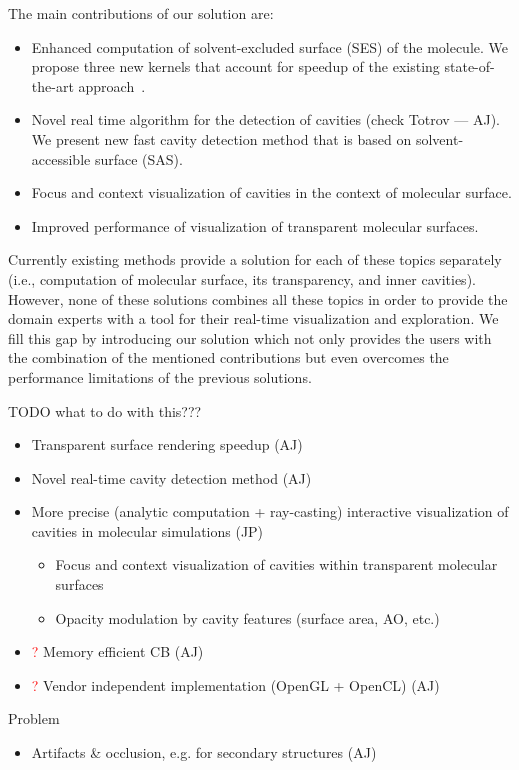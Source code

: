The main contributions of our solution are:
\begin{itemize}
  \item Enhanced computation of solvent-excluded surface (SES) of the molecule. We propose three new kernels that account for speedup of the existing state-of-the-art approach~\cite{todo}.
  \item Novel real time algorithm for the detection of cavities (check Totrov --- AJ). We present new fast cavity detection method that is based on solvent-accessible surface (SAS).
  \item Focus and context visualization of cavities in the context of molecular surface.
  \item Improved performance of visualization of transparent molecular surfaces.~\cite{todo}
\end{itemize}

Currently existing methods provide a solution for each of these topics separately (i.e., computation of molecular surface, its transparency, and inner cavities).
However, none of these solutions combines all these topics in order to provide the domain experts with a tool for their real-time visualization and exploration.
We fill this gap by introducing our solution which not only provides the users with the combination of the mentioned contributions but even overcomes the performance limitations of the previous solutions.


TODO what to do with this???
\begin{itemize}
  \item Transparent surface rendering speedup (AJ)
	\item Novel real-time cavity detection method (AJ)
	\item More precise (analytic computation + ray-casting) interactive visualization of cavities in molecular simulations (JP)
	\begin{itemize}
		\item Focus and context visualization of cavities within transparent molecular surfaces
		\item Opacity modulation by cavity features (surface area, AO, etc.)
	\end{itemize}
	\item \textcolor{red}{?} Memory efficient CB (AJ)
	\item \textcolor{red}{?} Vendor independent implementation (OpenGL + OpenCL) (AJ)
\end{itemize}

Problem
\begin{itemize}
  \item Artifacts \& occlusion, e.g. for secondary structures (AJ)
\end{itemize}


